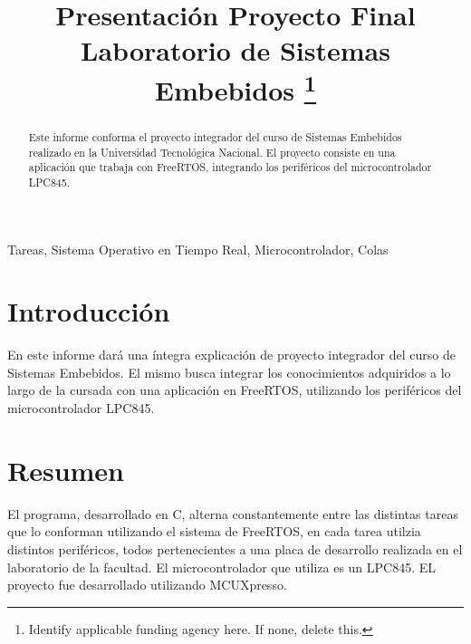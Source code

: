 \documentclass[conference]{IEEEtran}
\begin{document}
\title{Presentación Proyecto Final\\
{\Large Laboratorio de Sistemas Embebidos}
\thanks{Identify applicable funding agency here. If none, delete this.}
}

\author{
\and
{}
} 

\maketitle

\begin{abstract}
    Este informe conforma el proyecto integrador del curso de Sistemas Embebidos realizado en la Universidad Tecnológica Nacional. El proyecto consiste en una aplicación que trabaja con FreeRTOS, integrando los periféricos del microcontrolador LPC845.
\end{abstract}

\begin{IEEEkeywords}
    Tareas, Sistema Operativo en Tiempo Real, Microcontrolador, Colas
    
\end{IEEEkeywords}

\section{Introducción}
    En este informe dará una íntegra explicación de proyecto integrador del curso de Sistemas Embebidos. El mismo busca integrar los conocimientos adquiridos a lo largo de la cursada con una aplicación en FreeRTOS, utilizando los periféricos del microcontrolador LPC845.\par

\section{Resumen}

El programa, desarrollado en C, alterna constantemente entre las distintas tareas que lo conforman utilizando el sistema de FreeRTOS, en cada tarea utilzia distintos periféricos, todos pertenecientes a una placa de desarrollo realizada en el laboratorio de la facultad. El microcontrolador que utiliza es un LPC845. EL proyecto fue desarrollado utilizando MCUXpresso.\par
\end{document}

